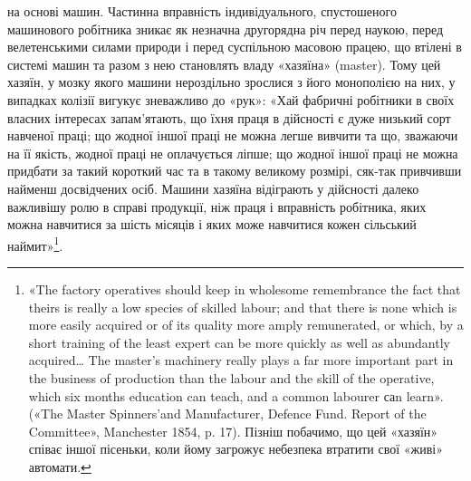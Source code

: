 на основі машин. Частинна вправність індивідуального,
спустошеного машинового робітника зникає як незначна другорядна
річ перед наукою, перед велетенськими силами природи
і перед суспільною масовою працею, що втілені в системі машин
та разом з нею становлять владу «хазяїна» (master). Тому цей хазяїн,
у мозку якого машини нероздільно зрослися з його монополією
на них, у випадках колізії вигукує зневажливо до «рук»:
«Хай фабричні робітники в своїх власних інтересах запам’ятають,
що їхня праця в дійсності є дуже низький сорт навченої
праці; що жодної іншої праці не можна легше вивчити та що,
зважаючи на її якість, жодної праці не оплачується ліпше; що
жодної іншої праці не можна придбати за такий короткий час та
в такому великому розмірі, сяк-так привчивши найменш досвідчених
осіб. Машини хазяїна відіграють у дійсності далеко важливішу
ролю в справі продукції, ніж праця і вправність робітника,
яких можна навчитися за шість місяців і яких може навчитися
кожен сільський наймит»\footnote{
«The factory operatives should keep in wholesome remembrance
the fact that theirs is really a low species of skilled labour; and that there
is none which is more easily acquired or of its quality more amply remunerated,
or which, by a short training of the least expert can be more quickly
as well as abundantly acquired\dots{} The master’s machinery really plays
a far more important part in the business of production than the labour
and the skill of the operative, which six months education can teach, and
a common labourer саn learn». («The Master Spinners’and Manufacturer,
Defence Fund. Report of the Committee», Manchester 1854, p. 17). Пізніш
побачимо, що цей «хазяїн» співає іншої пісеньки, коли йому загрожує
небезпека втратити свої «живі» автомати.
}.

